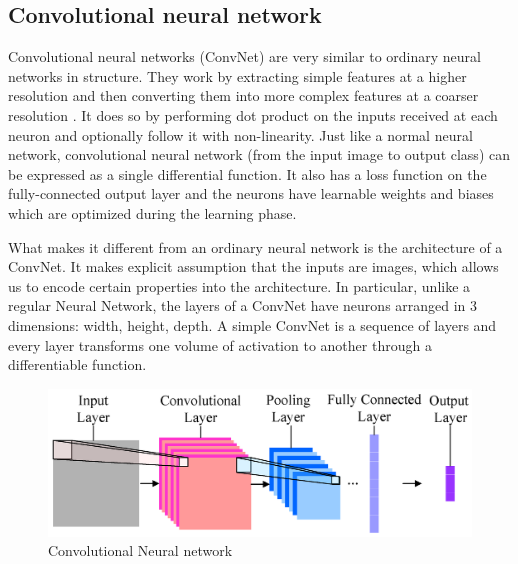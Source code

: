 \subsection{Convolutional neural network}
Convolutional neural networks (ConvNet) are very similar to ordinary neural networks in structure. They work by extracting simple features at a higher resolution and then converting them into more complex features at a coarser resolution \cite{simard2003best}. It does so by performing dot product on the inputs received at each neuron and optionally follow it with non-linearity. Just like a normal neural network, convolutional neural network (from the input image to output class) can be expressed as a single differential function. It also has a loss function on the fully-connected output layer and the neurons have learnable weights and biases which are optimized during the learning phase.

What makes it different from an ordinary neural network is the architecture of a ConvNet. It makes explicit assumption that the inputs are images, which allows us to encode certain properties into the architecture. In particular, unlike a regular Neural Network, the layers of a ConvNet have neurons arranged in 3 dimensions: width, height, depth. A simple ConvNet is a sequence of layers and every layer transforms one volume of activation to another through a differentiable function.

\begin{figure}[htb!]
    \centering
    \includegraphics[scale=1.25]{chapters/litReview/files/convNet.png}
    \caption{Convolutional Neural network \cite{convNN}}
    \label{Convolutional Neural network}
    \end{figure}
    \FloatBarrier
    
